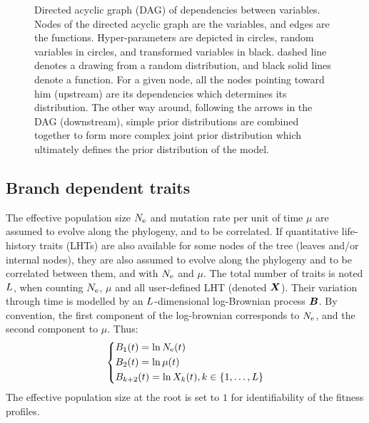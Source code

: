 \documentclass{article}
\begin{document}
\begin{figure}[t]
    \caption[Directed acyclic graph of dependencies between variables]{
        Directed acyclic graph (DAG) of dependencies between variables.
        Nodes of the directed acyclic graph are the variables, and edges are the functions.
        Hyper-parameters are depicted in {\color{RED}{red}} circles, random variables in {\color{BLUE}{blue}} circles, and transformed variables in black.
            {\color{BLUE}{Blue}} dashed line denotes a drawing from a random distribution, and black solid lines denote a function.
        For a given node, all the nodes pointing toward him (upstream) are its dependencies which determines its distribution.
        The other way around, following the arrows in the DAG (downstream), simple {prior} distributions are combined together to form more complex joint {prior} distribution which ultimately defines the {prior} distribution of the model.
    }\label{fig:DAG-MutSelNe}
\end{figure}

\subsection{Branch dependent traits}
The {effective population size} $N_{\text{e}}$ and mutation rate per unit of time $\mu$ are assumed to evolve along the phylogeny, and to be correlated.
If quantitative life-history traits ({LHT}s) are also available for some nodes of the tree (leaves and/or internal nodes), they are also assumed to evolve along the phylogeny and to be correlated between them, and with $N_{\text{e}}$ and $\mu$.
The total number of traits is noted $L$, when counting $N_{\text{e}}$, $\mu$ and all user-defined LHT (denoted $\bm{X}$).
Their variation through time is modelled by an $L$-dimensional log-Brownian process $\bm{B}$.
By convention, the first component of the log-brownian corresponds to $N_{\text{e}}$, and the second component to $\mu$.
Thus:
\begin{equation}
    \begin{dcases}
        B_1 (t) = \ln N_{\text{e}} (t) \\
        B_2 (t) = \ln \mu (t) \\
        B_{k+2}(t) = \ln X_k(t), k \in \{1, \hdots, L\}
    \end{dcases}
\end{equation}
The effective population size at the root is set to $1$ for identifiability of the fitness profiles.
\end{document}
